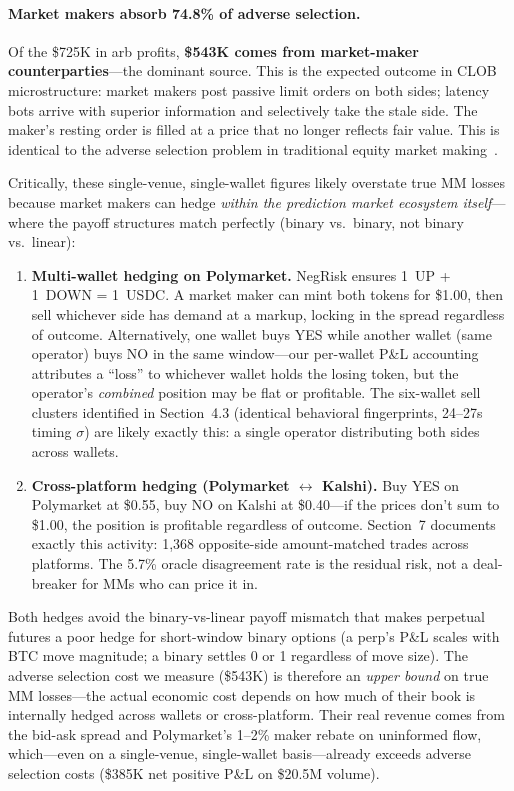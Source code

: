 \documentclass[11pt,a4paper]{article}
\begin{document}
\paragraph{Market makers absorb 74.8\% of adverse selection.} Of the \$725K in arb profits, \textbf{\$543K comes from market-maker counterparties}---the dominant source. This is the expected outcome in CLOB microstructure: market makers post passive limit orders on both sides; latency bots arrive with superior information and selectively take the stale side. The maker's resting order is filled at a price that no longer reflects fair value. This is identical to the adverse selection problem in traditional equity market making~\cite{saguillo2025}.

Critically, these single-venue, single-wallet figures likely overstate true MM losses because market makers can hedge \textit{within the prediction market ecosystem itself}---where the payoff structures match perfectly (binary vs.\ binary, not binary vs.\ linear):

\begin{enumerate}[nosep]
    \item \textbf{Multi-wallet hedging on Polymarket.} NegRisk ensures 1~UP + 1~DOWN = 1~USDC. A market maker can mint both tokens for \$1.00, then sell whichever side has demand at a markup, locking in the spread regardless of outcome. Alternatively, one wallet buys YES while another wallet (same operator) buys NO in the same window---our per-wallet P\&L accounting attributes a ``loss'' to whichever wallet holds the losing token, but the operator's \textit{combined} position may be flat or profitable. The six-wallet sell clusters identified in Section~4.3 (identical behavioral fingerprints, 24--27s timing $\sigma$) are likely exactly this: a single operator distributing both sides across wallets.
    \item \textbf{Cross-platform hedging (Polymarket $\leftrightarrow$ Kalshi).} Buy YES on Polymarket at \$0.55, buy NO on Kalshi at \$0.40---if the prices don't sum to \$1.00, the position is profitable regardless of outcome. Section~7 documents exactly this activity: 1,368 opposite-side amount-matched trades across platforms. The 5.7\% oracle disagreement rate is the residual risk, not a deal-breaker for MMs who can price it in.
\end{enumerate}

Both hedges avoid the binary-vs-linear payoff mismatch that makes perpetual futures a poor hedge for short-window binary options (a perp's P\&L scales with BTC move magnitude; a binary settles 0 or 1 regardless of move size). The adverse selection cost we measure (\$543K) is therefore an \textit{upper bound} on true MM losses---the actual economic cost depends on how much of their book is internally hedged across wallets or cross-platform. Their real revenue comes from the bid-ask spread and Polymarket's 1--2\% maker rebate on uninformed flow, which---even on a single-venue, single-wallet basis---already exceeds adverse selection costs (\$385K net positive P\&L on \$20.5M volume).
\end{document}
